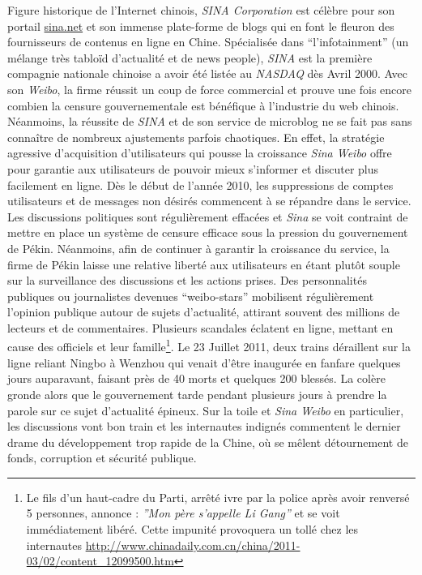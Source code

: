 Figure historique de l’Internet chinois, \textit{SINA Corporation} est célèbre pour son portail \url{sina.net} et son immense plate-forme de blogs qui en font le fleuron des fournisseurs de contenus en ligne en Chine. Spécialisée dans ``l’infotainment'' (un mélange très tabloïd d’actualité et de news people), \textit{SINA} est la première compagnie nationale chinoise a avoir été listée au \textit{NASDAQ} dès Avril 2000. Avec son \textit{Weibo}, la firme réussit un coup de force commercial et prouve une fois encore combien la censure gouvernementale est bénéfique à l’industrie du web chinois. Néanmoins, la réussite de \textit{SINA} et de son service de microblog ne se fait pas sans connaître de nombreux ajustements parfois chaotiques. En effet, la stratégie agressive d’acquisition d’utilisateurs qui pousse la croissance \textit{Sina Weibo} offre pour garantie aux utilisateurs de pouvoir mieux s’informer et discuter plus facilement en ligne. Dès le début de l’année 2010, les suppressions de comptes utilisateurs et de messages non désirés commencent à se répandre dans le service. Les discussions politiques sont régulièrement effacées et \textit{Sina} se voit contraint de mettre en place un système de censure efficace sous la pression du gouvernement de Pékin. Néanmoins, afin de continuer à garantir la croissance du service, la firme de Pékin laisse une relative liberté aux utilisateurs en étant plutôt souple sur la surveillance des discussions et les actions prises. Des personnalités publiques ou journalistes devenues “weibo-stars” mobilisent régulièrement l’opinion publique autour de sujets d’actualité, attirant souvent des millions de lecteurs et de commentaires. Plusieurs scandales éclatent en ligne, mettant en cause des officiels et leur famille\footnote{Le fils d’un haut-cadre du Parti, arrêté ivre par la police après avoir renversé 5 personnes, annonce : \textit{”Mon père s’appelle Li Gang”} et se voit immédiatement libéré. Cette impunité provoquera un tollé chez les internautes \url{http://www.chinadaily.com.cn/china/2011-03/02/content_12099500.htm}}. Le 23 Juillet 2011, deux trains déraillent sur la ligne reliant Ningbo à Wenzhou qui venait d’être inaugurée en fanfare quelques jours auparavant, faisant près de 40 morts et quelques 200 blessés. La colère gronde alors que le gouvernement tarde pendant plusieurs jours à prendre la parole sur ce sujet d’actualité épineux. Sur la toile et \textit{Sina Weibo} en particulier, les discussions vont bon train et les internautes indignés commentent le dernier drame du développement trop rapide de la Chine, où se mêlent détournement de fonds, corruption et sécurité publique. 


